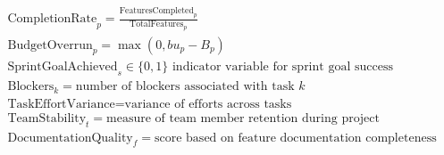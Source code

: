 \documentclass{article}
\begin{document}
\begin{align*}
    & \text{CompletionRate}_p = \frac{\text{FeaturesCompleted}_p}{\text{TotalFeatures}_p} \\
    & \text{BudgetOverrun}_p = \max(0, bu_p - B_p) \\
    & \text{SprintGoalAchieved}_s \in \{0,1\} \text{ indicator variable for sprint goal success} \\
    & \text{Blockers}_k = \text{number of blockers associated with task } k \\
    & \text{TaskEffortVariance} = \text{variance of efforts across tasks} \\
    & \text{TeamStability}_t = \text{measure of team member retention during project} \\
    & \text{DocumentationQuality}_f = \text{score based on feature documentation completeness} \\
\end{align*}
\end{document}

